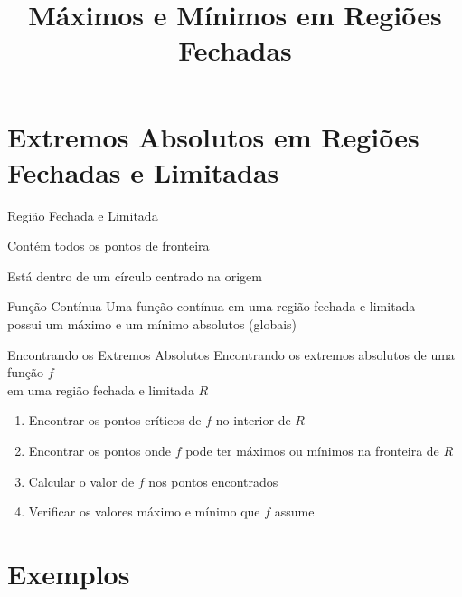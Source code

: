 \documentclass[fleqn,utf8,aspectratio=169,12pt]{beamer}
\title{Máximos e Mínimos em Regiões Fechadas}
\begin{document}
\addtitle

\section{Extremos Absolutos em Regiões Fechadas e Limitadas}

\begin{frame}{Região Fechada e Limitada}
  \begin{description}[<+->]
    \item[Fechada] Contém todos os pontos de fronteira \\[5mm]
    \item[Limitada] Está dentro de um círculo centrado na origem
  \end{description}
\end{frame}

\begin{frame}{Função Contínua}
  Uma função contínua em uma região fechada e limitada\\
  possui um máximo e um mínimo absolutos (globais)
\end{frame}

\begin{frame}{Encontrando os Extremos Absolutos}
  Encontrando os extremos absolutos de uma função $f$ \\
  em uma região fechada e limitada $R$
  \pause
  \begin{enumerate}[<+->]
    \item Encontrar os pontos críticos de $f$ no interior de $R$
    \item Encontrar os pontos onde $f$ pode ter máximos ou mínimos na fronteira de $R$
    \item Calcular o valor de $f$ nos pontos encontrados
    \item Verificar os valores máximo e mínimo que $f$ assume
  \end{enumerate}
\end{frame}

\section{Exemplos}
\end{document}
